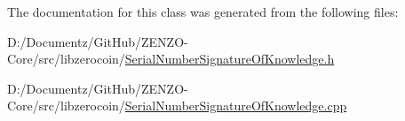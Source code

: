 The documentation for this class was generated from the following files\+:\begin{DoxyCompactItemize}
\item 
D\+:/\+Documentz/\+Git\+Hub/\+Z\+E\+N\+Z\+O-\/\+Core/src/libzerocoin/\mbox{\hyperlink{_serial_number_signature_of_knowledge_8h}{Serial\+Number\+Signature\+Of\+Knowledge.\+h}}\item 
D\+:/\+Documentz/\+Git\+Hub/\+Z\+E\+N\+Z\+O-\/\+Core/src/libzerocoin/\mbox{\hyperlink{_serial_number_signature_of_knowledge_8cpp}{Serial\+Number\+Signature\+Of\+Knowledge.\+cpp}}\end{DoxyCompactItemize}
